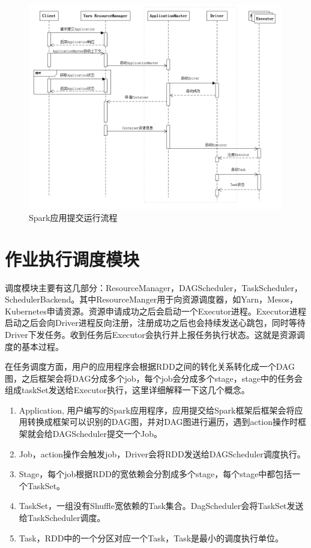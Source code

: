 \begin{figure}
    \centering
    \includegraphics[width=0.99\textwidth]{Img/spark-submit-time.png}
    \caption{Spark应用提交运行流程}
    \label{fig:spark-submit-job}
\end{figure}


\section{作业执行调度模块}

调度模块主要有这几部分：ResourceManager，DAGScheduler，TaskScheduler，SchedulerBackend。其中ResourceManger用于向资源调度器，如Yarn，Mesos，Kubernetes申请资源。资源申请成功之后会启动一个Executor进程。Executor进程启动之后会向Driver进程反向注册，注册成功之后也会持续发送心跳包，同时等待Driver下发任务。收到任务后Executor会执行并上报任务执行状态。这就是资源调度的基本过程。

在任务调度方面，用户的应用程序会根据RDD之间的转化关系转化成一个DAG图，之后框架会将DAG分成多个job，每个job会分成多个stage，stage中的任务会组成taskSet发送给Executor执行，这里详细解释一下这几个概念。

\begin{enumerate}
    \item Application, 用户编写的Spark应用程序，应用提交给Spark框架后框架会将应用转换成框架可以识别的DAG图，并对DAG图进行遍历，遇到action操作时框架就会给DAGScheduler提交一个Job。
    \item Job，action操作会触发job，Driver会将RDD发送给DAGScheduler调度执行。
    \item Stage，每个job根据RDD的宽依赖会分割成多个stage，每个stage中都包括一个TaskSet。
    \item TaskSet，一组没有Shuffle宽依赖的Task集合。DagScheduler会将TaskSet发送给TaskScheduler调度。
    \item Task，RDD中的一个分区对应一个Task，Task是最小的调度执行单位。
\end{enumerate}

